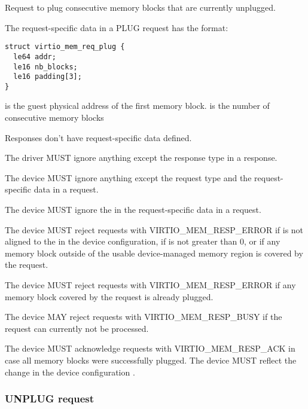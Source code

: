 Request to plug consecutive memory blocks that are currently unplugged.

The request-specific data in a PLUG request has the format:

\begin{lstlisting}
struct virtio_mem_req_plug {
  le64 addr;
  le16 nb_blocks;
  le16 padding[3];
}
\end{lstlisting}

 is the guest physical address of the first memory block.
 is the number of consecutive memory blocks

Responses don't have request-specific data defined.


The driver MUST ignore anything except the response type in a response.


The device MUST ignore anything except the request type and the
request-specific data in a request.

The device MUST ignore the  in the request-specific data in
a request.

The device MUST reject requests with VIRTIO_MEM_RESP_ERROR if 
is not aligned to the  in the device configuration, if
 is not greater than 0, or if any memory block outside of
the usable device-managed memory region is covered by the request.

The device MUST reject requests with VIRTIO_MEM_RESP_ERROR if any memory
block covered by the request is already plugged.

The device MAY reject requests with VIRTIO_MEM_RESP_BUSY if the request can
currently not be processed.

The device MUST acknowledge requests with VIRTIO_MEM_RESP_ACK in case all
memory blocks were successfully plugged.  The device MUST reflect the
change in the device configuration .

\subsubsection{UNPLUG request}\label{sec:Device Types / Memory Device / Device Operation / UNPLUG request}

